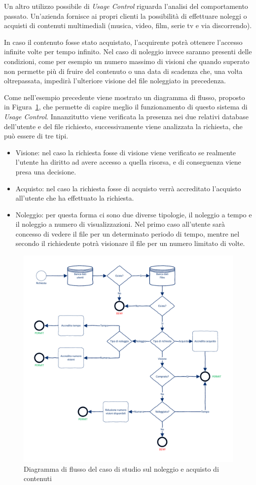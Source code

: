 Un altro utilizzo possibile di \textit{Usage Control} riguarda l'analisi del comportamento passato. Un'azienda fornisce  ai propri clienti 
la possibilità di effettuare noleggi o acquisti di contenuti multimediali (musica, video, film, serie tv e via discorrendo).\par
In caso il contenuto fosse stato acquistato, l’acquirente potrà ottenere
l’accesso infinite volte per tempo infinito. Nel caso di noleggio invece
saranno presenti delle condizioni, come per esempio un numero massimo di visioni che quando superato non permette più di fruire del contenuto o una data di scadenza che, una volta oltrepassata,
impedirà l’ulteriore visione del file noleggiato in precedenza.\par
Come nell’esempio precedente viene mostrato un diagramma di flusso,
proposto in Figura~\ref{fig:diagrammaflussosecondoesempio}, che permette di capire meglio il funzionamento di questo sistema di \textit{Usage Control}. Innanzitutto viene verificata la presenza nei due relativi database dell'utente e del file richiesto, successivamente viene analizzata la richiesta, che può essere di tre tipi.
\begin{itemize}
\item Visione: nel caso la richiesta fosse di visione viene verificato se realmente l'utente ha diritto ad avere accesso a quella risorsa, e di conseguenza viene presa una decisione.
\item Acquisto: nel caso la richiesta fosse di acquisto verrà accreditato l'acquisto all'utente che ha effettuato la richiesta.
\item Noleggio: per questa forma ci sono due diverse tipologie, il noleggio a tempo e il noleggio a numero di visualizzazioni. Nel primo caso all'utente sarà concesso di vedere il file per un determinato periodo di tempo, mentre nel secondo il richiedente potrà visionare il file per un numero limitato di volte.
\end{itemize}
\begin{figure}[h]
 \centering 
	\includegraphics[width = 1.1\textwidth]{./Visio_Project/DiagrammaFlussoSecondoEsempio.pdf}
 \caption{Diagramma di flusso del caso di studio sul noleggio e acquisto di contenuti}
 \label{fig:diagrammaflussosecondoesempio}
\end{figure}
